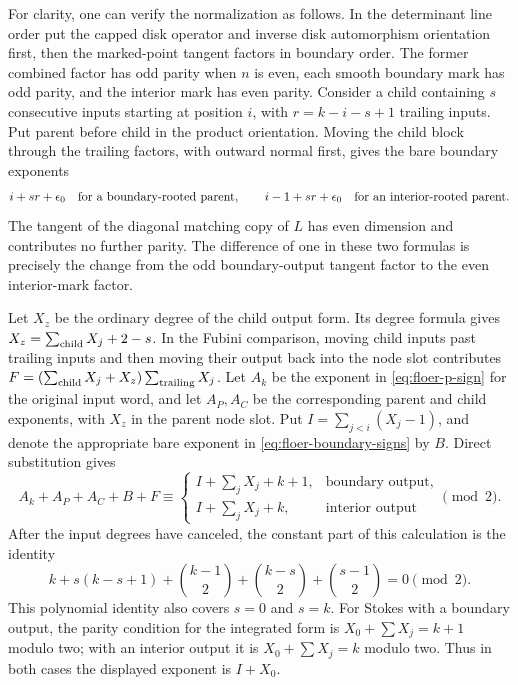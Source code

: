 \documentclass[11pt]{article}
\numberwithin{equation}{section}
\theoremstyle{definition}
\theoremstyle{remark}
\begin{document}
For clarity, one can verify the normalization as follows.  In the
determinant line order put the capped disk operator and inverse disk
automorphism orientation first, then the marked-point tangent factors
in boundary order.  The former combined factor has odd parity when
$n$ is even, each smooth boundary mark has odd parity, and the interior
mark has even parity.  Consider a child containing $s$ consecutive
inputs starting at position $i$, with $r=k-i-s+1$ trailing inputs.
Put parent before child in the product orientation.  Moving the child
block through the trailing factors, with outward normal first, gives
the bare boundary exponents
\begin{equation}
 \label{eq:floer-boundary-signs}
 i+sr+\epsilon_0
 \quad\hbox{for a boundary-rooted parent},\qquad
 i-1+sr+\epsilon_0
 \quad\hbox{for an interior-rooted parent}.
\end{equation}
The tangent of the diagonal matching copy of $L$ has even dimension
and contributes no further parity.  The difference of one in these
two formulas is precisely the change from the odd boundary-output
tangent factor to the even interior-mark factor.

Let $X_z$ be the ordinary degree of the child output form.  Its degree
formula gives $X_z=\sum_{\rm child}X_j+2-s$.  In the Fubini comparison,
moving child inputs past trailing inputs and then moving their output
back into the node slot contributes
$F=(\sum_{\rm child}X_j+X_z)\sum_{\rm trailing}X_j$.
Let $A_k$ be the exponent in \eqref{eq:floer-p-sign} for the original
input word, and let $A_P,A_C$ be the corresponding parent and child
exponents, with $X_z$ in the parent node slot.  Put
$I=\sum_{j<i}(X_j-1)$, and denote the appropriate bare exponent in
\eqref{eq:floer-boundary-signs} by $B$.  Direct substitution gives
\[
 A_k+A_P+A_C+B+F\equiv
 \begin{cases}
 I+\sum_jX_j+k+1,&\text{boundary output},\\
 I+\sum_jX_j+k,&\text{interior output}
 \end{cases}
 \pmod2.
\]
After the input degrees have canceled, the constant part of this
calculation is the identity
\[
 k+s(k-s+1)+\binom{k-1}{2}+\binom{k-s}{2}
                   +\binom{s-1}{2}=0\pmod2.
\]
This polynomial identity also covers $s=0$ and $s=k$.
For Stokes with a boundary output, the parity condition for the
integrated form is $X_0+\sum X_j=k+1$ modulo two; with an interior
output it is $X_0+\sum X_j=k$ modulo two.  Thus in both cases the
displayed exponent is $I+X_0$.
\end{document}
